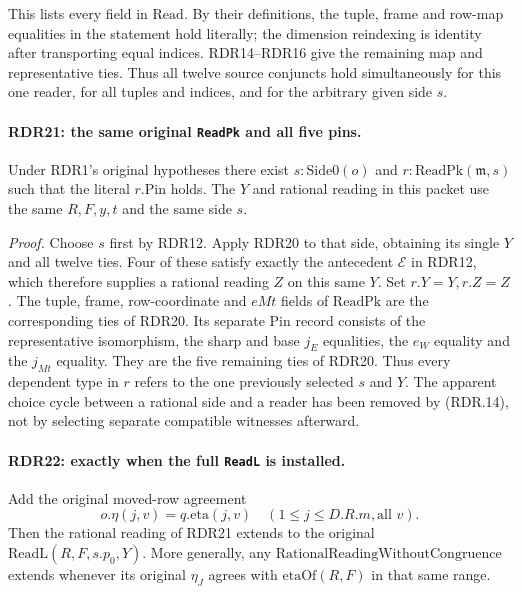 This lists every field in \(\mathrm{Read}\).  By their
definitions, the tuple, frame and row-map equalities in
the statement hold literally; the dimension reindexing
is identity after transporting equal indices.  RDR14--RDR16
give the remaining map and representative ties.  Thus all
twelve source conjuncts hold simultaneously for this one
reader, for all tuples and indices, and for the arbitrary
given side \(s\).

\paragraph{RDR21: the same original \texttt{ReadPk} and all five pins.}
\label{claim:RDR21}
Under RDR1's original hypotheses there exist
\(s:\mathrm{Side0}(o)\) and \(r:\mathrm{ReadPk}(\mathfrak m,s)\)
such that the literal \(r.\mathrm{Pin}\) holds.  The
\(Y\) and rational reading in this packet use the same
\(R,F,y,t\) and the same side \(s\).

\emph{Proof.}
Choose \(s\) first by RDR12.  Apply RDR20 to that side,
obtaining its single \(Y\) and all twelve ties.
Four of these satisfy exactly the antecedent \(\mathcal E\)
in RDR12, which therefore supplies a rational reading
\(Z\) on this same \(Y\).  Set \(r.Y=Y,r.Z=Z\).
The tuple, frame, row-coordinate and \(eMt\) fields of
\(\mathrm{ReadPk}\) are the corresponding ties of RDR20.
Its separate \(\mathrm{Pin}\) record consists of the
representative isomorphism, the sharp and base \(j_E\)
equalities, the \(e_W\) equality and the \(j_{Mt}\)
equality.  They are the five remaining ties of RDR20.
Thus every dependent type in \(r\) refers to the one
previously selected \(s\) and \(Y\).  The apparent
choice cycle between a rational side and a reader has
been removed by (RDR.14), not by selecting separate
compatible witnesses afterward.

\paragraph{RDR22: exactly when the full \texttt{ReadL} is installed.}
\label{claim:RDR22}
Add the original moved-row agreement
\[
           o.\eta(j,v)=q.\mathrm{eta}(j,v)
                       \quad(1\le j\le D.R.m, \text{all }v).
                                                               \tag{RDR.31}
\]
Then the rational reading of RDR21 extends to the original
\(\mathrm{ReadL}(R,F,s.p_0,Y)\).  More generally, any
\(\mathrm{RationalReadingWithoutCongruence}\) extends
whenever its original \(\eta_J\) agrees with
\(\mathrm{etaOf}(R,F)\) in that same range.

